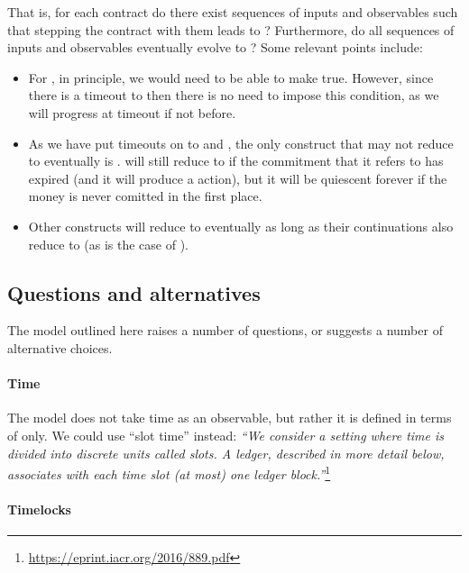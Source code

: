 \documentclass[
      acmsmall
    , screen
  ]{acmart}
\begin{document}
That is, for each contract do there exist sequences of inputs and observables such that stepping the contract with them 
leads to ? Furthermore, do all sequences of inputs and observables eventually evolve to 
? Some relevant points include:
\begin{itemize}
\item For , in principle, we would need to be able to make  
true. However, since there is  a timeout to  then there is no need to impose this condition, as we 
will progress at timeout if not before.
\item As we have put timeouts on to  and , the only construct that may not 
reduce to  eventually is .  will still reduce to 
 if the commitment that it refers to has expired (and it will produce a 
 action), but it will be quiescent forever if the money is never comitted in the first 
place.
\item Other constructs will reduce to  eventually as long as their continuations also reduce to 
 (as is the case of ).
\end{itemize}

\subsection{Questions and alternatives}

The model outlined here raises a number of questions, or suggests a number of alternative choices.

\paragraph{Time}

The model does not take time as an observable, but rather it is defined in terms of  only. We could  use ``slot time'' instead: \emph{``We consider a setting where time is divided into discrete units called slots. A ledger, described in more detail below, associates with each time slot (at most) one ledger block.''}\footnote{\url{https://eprint.iacr.org/2016/889.pdf}}

\paragraph{Timelocks}
\end{document}
